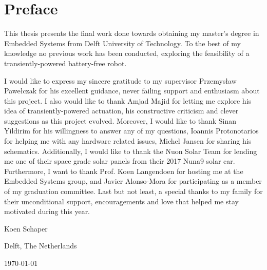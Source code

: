 \chapter*{Preface}

This thesis presents the final work done towards obtaining my master’s degree in Embedded Systems from Delft University of Technology.
To the best of my knowledge no previous work has been conducted, exploring the feasibility of a transiently-powered battery-free robot. 


\vspace{1\baselineskip}

\noindent
I would like to express my sincere gratitude to my supervisor Przemys\l{}aw Pawe\l{}czak for his excellent guidance, never failing support and enthusiasm about this project. 
I also would like to thank Amjad Majid for letting me explore his idea of transiently-powered actuation, his constructive criticism and clever suggestions as this project evolved.
Moreover, I would like to thank Sinan Yildirim for his willingness to answer any of my questions, Ioannis Protonotarios for helping me with any hardware related issues, Michel Jansen for sharing his schematics.
Additionally, I would like to thank the Nuon Solar Team for lending me one of their space grade solar panels from their 2017 Nuna9 solar car.
Furthermore, I want to thank Prof. Koen Langendoen for hosting me at the Embedded Systems group, and Javier Alonso-Mora for participating as a member of my graduation committee.
Last but not least, a special thanks to my family for their unconditional support, encouragements and love that helped me stay motivated during this year.

\vspace{1\baselineskip}

\noindent
Koen Schaper

\vspace{1\baselineskip}

\noindent
Delft, The Netherlands

\noindent
\today
